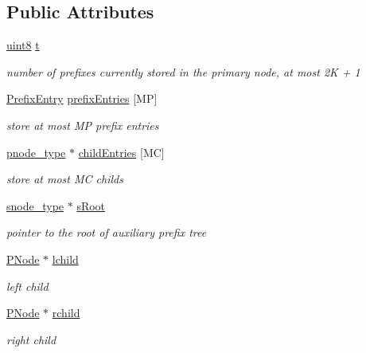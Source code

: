 \subsection*{Public Attributes}
\begin{DoxyCompactItemize}
\item 
\hyperlink{types_8h_a34ecedcf03a70dc91e4616212d79267d}{uint8} \hyperlink{structPNode_a58484ae1cfa0fe762806f39d5c646234}{t}
\begin{DoxyCompactList}\small\item\em number of prefixes currently stored in the primary node, at most 2\-K + 1 \end{DoxyCompactList}\item 
\hyperlink{structPNode_1_1PrefixEntry}{Prefix\-Entry} \hyperlink{structPNode_a477430658ef15677735be12d8143ca1a}{prefix\-Entries} \mbox{[}M\-P\mbox{]}
\begin{DoxyCompactList}\small\item\em store at most M\-P prefix entries \end{DoxyCompactList}\item 
\hyperlink{structPNode_a9f0e0153a9ff0faff3baa323c601f03a}{pnode\-\_\-type} $\ast$ \hyperlink{structPNode_abd7d00e0bc8cf69aa4911370670cd8f5}{child\-Entries} \mbox{[}M\-C\mbox{]}
\begin{DoxyCompactList}\small\item\em store at most M\-C childs \end{DoxyCompactList}\item 
\hyperlink{structPNode_a7d5f0e3af582a8c9f59a479f99a6ac09}{snode\-\_\-type} $\ast$ \hyperlink{structPNode_af0f3bf3fceb117941659ee4330c7dc93}{s\-Root}
\begin{DoxyCompactList}\small\item\em pointer to the root of auxiliary prefix tree \end{DoxyCompactList}\item 
\hyperlink{structPNode}{P\-Node} $\ast$ \hyperlink{structPNode_a14ee4a20bc0ab9644fb2ef69d0dfc22c}{lchild}
\begin{DoxyCompactList}\small\item\em left child \end{DoxyCompactList}\item 
\hyperlink{structPNode}{P\-Node} $\ast$ \hyperlink{structPNode_a90d84fa69af0037418ffa2e42e5155f9}{rchild}
\begin{DoxyCompactList}\small\item\em right child \end{DoxyCompactList}\item 

\end{DoxyCompactItemize}

